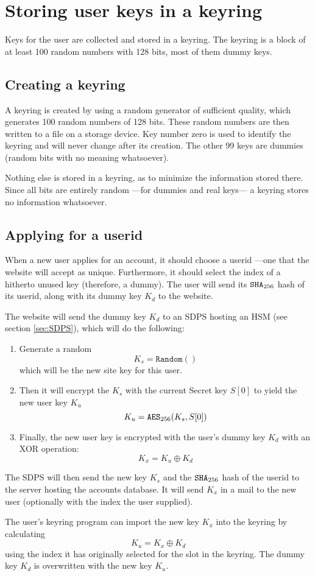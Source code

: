 \section{Storing user keys in a keyring}
\label{sec:keyring}
Keys for the user are collected and stored in a keyring.
The keyring is a block of at least 100 random numbers with 128 bits, most of them dummy keys.

\subsection{Creating a keyring}
A keyring is created by using a random generator of sufficient quality,
which generates 100 random numbers of 128 bits.
These random numbers are then written to a file on a storage device.
Key number zero is used to identify the keyring and will never change after its creation.
The other 99 keys are dummies (random bits with no meaning whatsoever).
\par
Nothing else is stored in a keyring, as to minimize the information stored there.
Since all bits are entirely random%
---for dummies and real keys---%
a keyring stores no information whatsoever.

\subsection{Applying for a userid}
\label{sec:applying}
When a new user applies for an account, it should choose a userid%
---one that the website will accept as unique.
Furthermore, it should select the index of a hitherto unused key
(therefore, a dummy).
The user will send its $\mathtt{SHA}_{256}$ hash of its userid,
along with its dummy key $K_d$ to the website.
\par
The website will send the dummy key $K_d$ to an SDPS hosting an HSM (see section \ref{sec:SDPS}),
which will do the following:
\begin{enumerate}
\item Generate a random
\[K_s=\mathtt{Random}()\]
which will be the new site key for this user.
\item Then it will encrypt the $K_s$ with the current Secret key $S[0]$ to yield the new user key $K_u$
\[K_u=\mathtt{AES}_{256}(K_s, S[0])\]
\item Finally, the new user key is encrypted with the user's dummy key $K_d$
with an XOR operation:
\[K_x=K_u \oplus K_d\]
\end{enumerate}
The SDPS will then send the new key $K_s$ and the $\mathtt{SHA}_{256}$ hash of the userid to the server hosting the accounts database.
It will send $K_x$ in a mail to the new user (optionally with the index the user supplied).
\par
The user's keyring program can import the new key $K_x$ into the keyring by calculating
\[K_u=K_x \oplus K_d\]
using the index it has originally selected for the slot in the keyring.
The dummy key $K_d$ is overwritten with the new key $K_u$.

